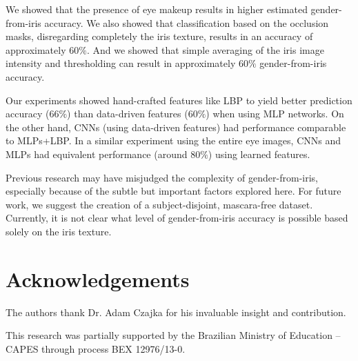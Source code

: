 \documentclass[10pt,twocolumn,letterpaper]{article}
\begin{document}
We showed that the presence of eye makeup results in 
higher estimated gender-from-iris accuracy.
We also showed that classification based on the occlusion masks, disregarding completely the iris texture, results in an accuracy of approximately $60\%$.
And we showed that simple averaging of the iris image intensity and thresholding can result in approximately $60\%$ gender-from-iris accuracy.

Our experiments showed hand-crafted features like LBP to yield better prediction accuracy ($66\%$) than data-driven features ($60\%$) when using MLP networks.
On the other hand, CNNs (using data-driven features) had performance comparable to MLPs+LBP.
In a similar experiment using the entire eye images, CNNs and MLPs had equivalent performance (around $80\%$) using learned features.

Previous research may have misjudged the complexity of gender-from-iris, especially because of the subtle but important factors explored here. 
For future work, we suggest the creation of a subject-disjoint, mascara-free dataset. 
Currently, it is not clear what level of gender-from-iris accuracy is possible based solely on the iris texture.

\section{Acknowledgements}

The authors thank Dr. Adam Czajka for his invaluable insight and contribution.

This research was partially supported by the Brazilian Ministry of Education -- CAPES through process BEX 12976/13-0. 

{\small


}
\end{document}
